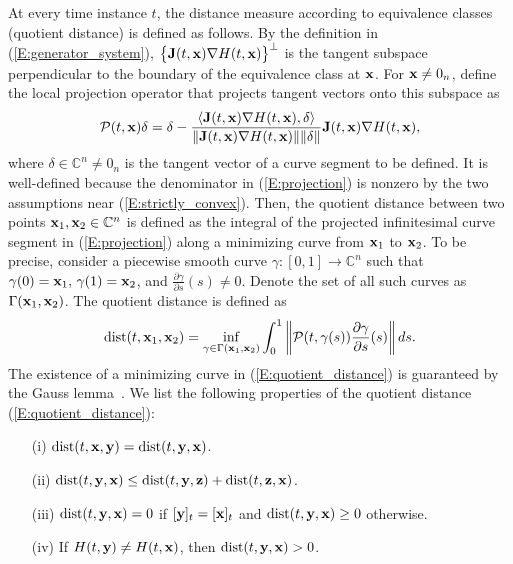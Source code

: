 At every time instance $t$, the distance measure according to equivalence classes (quotient distance) is defined as follows. 
By the definition in (\ref{E:generator_system}),
$\big\{\mathbf{J}(t, \mathbf{x}) \nabla H(t, \mathbf{x})\big\}^\perp$
is the tangent subspace perpendicular to the boundary of the equivalence class at $\mathbf{x}$.
For $\mathbf{x} \neq 0_n$, define the local projection operator that projects tangent vectors onto this subspace as
\begin{equation} \label{E:projection}
    \mathcal P(t, \mathbf{x}) \delta = \delta - \frac{\langle \mathbf{J}(t, \mathbf{x}) \nabla H(t, \mathbf{x}), \delta \rangle}{\| \mathbf{J}(t, \mathbf{x}) \nabla H(t, \mathbf{x})\| \|\delta\|} \mathbf{J}(t, \mathbf{x}) \nabla H(t, \mathbf{x}),
\end{equation}
where $\delta \in \mathbb{C}^n \neq 0_n$ is the tangent vector of a curve segment to be defined. It is well-defined because the denominator in (\ref{E:projection}) is nonzero by the two assumptions near (\ref{E:strictly_convex}). Then, the quotient distance between two points $\mathbf{x}_1, \mathbf{x}_2 \in \mathbb{C}^n$ is defined as the integral of the projected infinitesimal curve segment in (\ref{E:projection}) along a minimizing curve from $\mathbf{x}_1$ to $\mathbf{x}_2$. 
To be precise, consider a piecewise smooth curve $\gamma: [0, 1] \to \mathbb{C}^n$ such that $\gamma(0) = \mathbf{x}_1,\, \gamma(1) = \mathbf{x}_2$, and $\frac{\partial\gamma}{\partial s}(s) \neq 0$. Denote the set of all such curves as $\Gamma(\mathbf{x}_1, \mathbf{x}_2)$. The quotient distance is defined as
\begin{equation} \label{E:quotient_distance}
    \operatorname*{dist}(t, \mathbf{x}_1, \mathbf{x}_2) = \inf_{\gamma \in \Gamma(\mathbf{x}_1, \mathbf{x}_2)} \int_0^1 \bigg\|\mathcal P(t, \gamma(s)) \frac{\partial\gamma}{\partial s}(s)\bigg\|\, ds.
\end{equation}
The existence of a minimizing curve in (\ref{E:quotient_distance}) is guaranteed by the Gauss lemma~\cite[Ch.~6]{bao2012introduction}.
We list the following properties of the quotient distance (\ref{E:quotient_distance}):
\begin{enumerate}
    \item[(i)] $\operatorname*{dist}(t, \mathbf{x}, \mathbf{y}) = \operatorname*{dist}(t, \mathbf{y}, \mathbf{x})$.
    \item[(ii)] $\operatorname*{dist}(t, \mathbf{y}, \mathbf{x}) \leq \operatorname*{dist}(t, \mathbf{y}, \mathbf{z}) + \operatorname*{dist}(t, \mathbf{z}, \mathbf{x})$.
    \item[(iii)] $\operatorname*{dist}(t, \mathbf{y}, \mathbf{x}) = 0$ if $[\mathbf{y}]_t = [\mathbf{x}]_t$ and $\operatorname*{dist}(t, \mathbf{y}, \mathbf{x}) \geq 0$ otherwise.
    \item[(iv)] If $H(t, \mathbf{y}) \neq H(t, \mathbf{x})$, then $\operatorname*{dist}(t, \mathbf{y}, \mathbf{x}) > 0$.
\end{enumerate}

